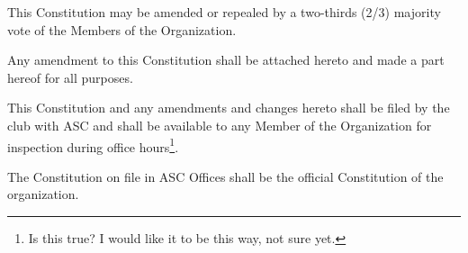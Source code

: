 \documentclass[12pt]{constitution}
\begin{document}

This Constitution may be amended or repealed by a two-thirds (2/3) majority vote of the Members of the Organization.

Any amendment to this Constitution shall be attached hereto and made a part hereof for all purposes.

This Constitution and any amendments and changes hereto shall be filed by the club with ASC and shall be available to any Member of the Organization for inspection during office hours\footnote{Is this true? I would like it to be this way, not sure yet.}.

The Constitution on file in ASC Offices shall be the official Constitution of the organization.
\end{document}

